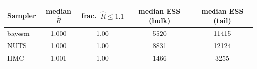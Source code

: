 \begin{tabular}{lcccc}
\toprule
Sampler & median $\widehat{R}$ & frac.\ $\widehat{R}\leq1.1$ & median ESS (bulk) & median ESS (tail) \\
\midrule
bayesm & 1.000 & 1.00 & 5520 & 11415 \\
NUTS & 1.000 & 1.00 & 8831 & 12124 \\
HMC & 1.001 & 1.00 & 1466 & 3255 \\
\bottomrule
\end{tabular}
